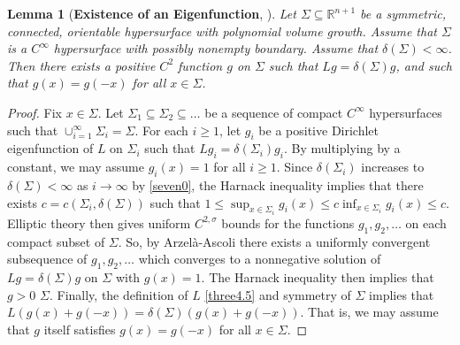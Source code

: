 \documentclass[12pt,reqno]{amsart}
\newtheorem{lemma}[theorem]{Lemma}
\theoremstyle{definition}
\renewcommand{\subset}{\subseteq}
\newcommand{\R}{\mathbb{R}}
\newcommand{\embolden}[1]{\textbf {#1}}
\newcommand{\adimn}{n+1}
\newcommand{\pcon}{\delta}
\begin{document}
\begin{lemma}[\embolden{Existence of an Eigenfunction}, {\cite[Lemma 6.5]{zhu16}}]\label{lemma40.9}
Let $\Sigma\subset\R^{\adimn}$ be a symmetric, connected, orientable hypersurface with polynomial volume growth.  Assume that $\Sigma$ is a $C^{\infty}$ hypersurface with possibly nonempty boundary.  Assume that $\pcon(\Sigma)<\infty$.  Then there exists a positive $C^{2}$ function $g$ on $\Sigma$ such that $Lg=\pcon(\Sigma)g$, and such that $g(x)=g(-x)$ for all $x\in\Sigma$.
\end{lemma}
\begin{proof}
Fix $x\in\Sigma$.  Let $\Sigma_{1}\subset\Sigma_{2}\subset\ldots$ be a sequence of compact $C^{\infty}$ hypersurfaces such that $\cup_{i=1}^{\infty}\Sigma_{i}=\Sigma$.  For each $i\geq1$, let $g_{i}$ be a positive Dirichlet eigenfunction of $L$ on $\Sigma_{i}$ such that $Lg_{i}=\pcon(\Sigma_{i})g_{i}$.  By multiplying by a constant, we may assume $g_{i}(x)=1$ for all $i\geq1$. Since $\pcon(\Sigma_{i})$ increases to $\pcon(\Sigma)<\infty$ as $i\to\infty$ by \eqref{seven0}, the Harnack inequality implies that there exists $c=c(\Sigma_{i},\pcon(\Sigma))$ such that $1\leq\sup_{x\in\Sigma_{i}}g_{i}(x)\leq c\inf_{x\in\Sigma_{i}}g_{i}(x)\leq c$.  Elliptic theory then gives uniform $C^{2,\sigma}$ bounds for the functions $g_{1},g_{2},\ldots$ on each compact subset of $\Sigma$.  So, by Arzel\`{a}-Ascoli there exists a uniformly convergent subsequence of $g_{1},g_{2},\ldots$ which converges to a nonnegative solution of $Lg=\pcon(\Sigma)g$ on $\Sigma$ with $g(x)=1$.  The Harnack inequality then implies that $g>0$ $\Sigma$.  Finally, the definition of $L$ \eqref{three4.5} and symmetry of $\Sigma$ implies that $L(g(x)+g(-x))=\pcon(\Sigma)(g(x)+g(-x))$.  That is, we may assume that $g$ itself satisfies $g(x)=g(-x)$ for all $x\in\Sigma$.
\end{proof}
\end{document}

